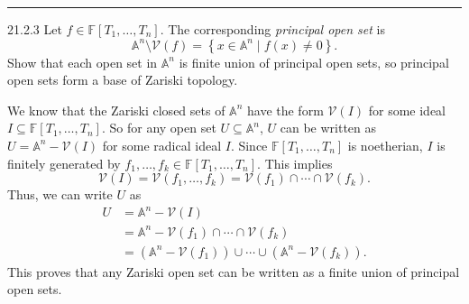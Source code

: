 \documentclass[letterpaper, 12pt]{article}
\begin{document}
\noindent\rule{7in}{2.8pt}
\begin{problem}{21.2.3}
Let \(f\in \mathbb{F}[T_1,\ldots,T_n]\). The corresponding \textit{principal open set} is 
\[\mathbb{A}^n\setminus \mathcal{V}(f)=\left\{ x\in \mathbb{A}^n\mid f(x)\neq 0 \right\}.\]
Show that each open set in \(\mathbb{A}^n\) is finite union of principal open sets, so principal open sets form a base of Zariski topology.
\end{problem}
\begin{solution}
We know that the Zariski closed sets of \(\mathbb{A}^n\) have the form \(\mathcal{V}(I)\) for some ideal \(I\subseteq \mathbb{F}[T_1,\ldots,T_n]\). So for any open set \(U\subseteq \mathbb{A}^n\), \(U\) can be written as \(U=\mathbb{A}^n-\mathcal{V}(I)\) for some radical ideal \(I\). Since \(\mathbb{F}[T_1,\ldots,T_n]\) is noetherian, \(I\) is finitely generated by \(f_1,\ldots,f_k\in \mathbb{F}[T_1,\ldots,T_n]\). This implies 
\[\mathcal{V}(I)=\mathcal{V}(f_1,\ldots,f_k)=\mathcal{V}(f_1)\cap\cdots\cap \mathcal{V}(f_k).\]
Thus, we can write \(U\) as 
\begin{align*}
    U&=\mathbb{A}^n-\mathcal{V}(I)\\ 
     &=\mathbb{A}^n-\mathcal{V}(f_1)\cap \cdots\cap \mathcal{V}(f_k)\\ 
     &=(\mathbb{A}^n-\mathcal{V}(f_1))\cup \cdots\cup (\mathbb{A}^n-\mathcal{V}(f_k)).
\end{align*}
This proves that any Zariski open set can be written as a finite union of principal open sets.
\end{solution}
\end{document}
